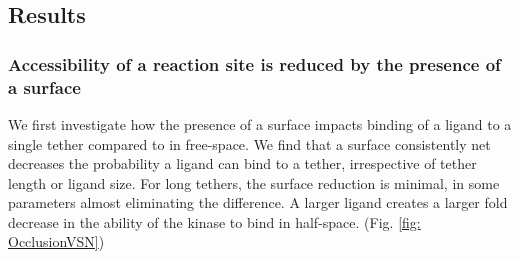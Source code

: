 \documentclass[../../AdvancementSummary.tex]{subfiles}
\begin{document}
%
%
%
%



\subsection{Results}

\subsubsection{Accessibility of a reaction site is reduced by the presence of a surface}

We first investigate how the presence of a surface impacts binding of a ligand to a single tether compared to in free-space. We find that a surface consistently net decreases the probability a ligand can bind to a tether, irrespective of tether length or ligand size. For long tethers, the surface reduction is minimal, in some parameters almost eliminating the difference. A larger ligand creates a larger fold decrease in the ability of the kinase to bind in half-space. (Fig. \ref{fig: OcclusionVSN})
\end{document}

